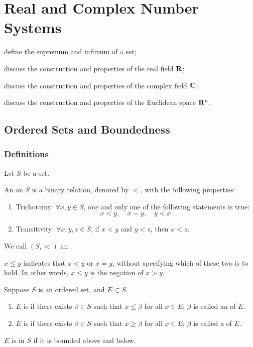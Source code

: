 \chapter{Real and Complex Number Systems}\label{chap:number-systems}

\begin{learn}
\item define the supremum and infimum of a set;
\item discuss the construction and properties of the real field $\mathbf R$;
\item discuss the construction and properties of the complex field $\mathbf C$;
\item discuss the construction and properties of the Euclidean space $\mathbf R^n$.
\end{learn}

\section{Ordered Sets and Boundedness}
\subsection{Definitions}
Let $S$ be a set.
\begin{definition}[Order]
An  on $S$ is a binary relation, denoted by $<$, with the following properties:
\begin{enumerate}[label=(\roman*)]
\item Trichotomy: $\forall x,y \in S$, one and only one of the following statements is true:
\[x<y,\quad x=y,\quad y<x.\]
\item Transitivity: $\forall x,y,z \in S$, if $x<y$ and $y<z$, then $x<z$.
\end{enumerate}
We call $(S,<)$ an .
\end{definition}

\begin{notation}
$x \le y$ indicates that $x<y$ or $x=y$, without specifying which of these two is to hold. In other words, $x\le y$ is the negation of $x>y$.
\end{notation}

\begin{definition}[Boundedness]
Suppose $S$ is an ordered set, and $E\subset S$.
\begin{enumerate}[label=(\roman*)]
\item $E$ is  if there exists $\beta\in S$ such that $x\le\beta$ for all $x\in E$; $\beta$ is called an  of $E$.
\item $E$ is  if there exists $\beta\in S$ such that $x\ge\beta$ for all $x\in E$; $\beta$ is called a  of $E$.
\end{enumerate}
$E$ is  in $S$ if it is bounded above and below.
\end{definition}

